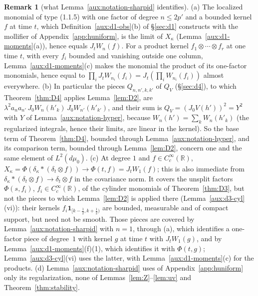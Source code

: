 \documentclass[11pt,a4paper]{article}
\theoremstyle{plain}
\theoremstyle{definition}
\theoremstyle{plain}
\theoremstyle{definition}
\newtheorem{auxrem}[auxlemma]{Remark}
\newcommand{\R}{\mathbb{R}}
\newcommand{\dmu}{d\mu_0}
\begin{document}
\begin{auxrem}[what Lemma~\ref{aux:notation-sharpid} identifies]\label{aux:notation-sharpidrem}
(a) The localized monomial of type (1.1.5) with one factor of degree $n\le2p'$ and a bounded
kernel $f$ at time $t$, which Definition~\ref{aux:d1-obs}(b) of \S\ref{sec:d1} constructs with the
mollifier of Appendix~\ref{app:huniform}, is the limit of $X_\kappa$ (Lemma~\ref{aux:d1-moments}(a)), hence equals
$J_tW_n(f)$.  For a product kernel $f_1\otimes\cdots\otimes f_r$ at one time $t$, with every $f_i$
bounded and vanishing outside one column, Lemma~\ref{aux:d1-moments}(c) makes the monomial the
product of its one-factor monomials, hence equal to
$\prod_iJ_tW_{n_i}(f_i)=J_t(\prod_iW_{n_i}(f_i))$ almost everywhere.
(b) In particular the pieces $Q_{n,n',k,k'}$ of $Q_V$ (\S\ref{sec:d4}), to which
Theorem~\ref{thm:D4} applies Lemma~\ref{lem:D2}, are
$\lambda^2a_na_{n'}\,J_0W_n(h'_k)\,J_0W_{n'}(h'_{k'})$, and their sum is $Q_V=(J_0V(h'))^2=Y^2$ with
$Y$ of Lemma~\ref{aux:notation-hyper}, because $W_n(h')=\sum_kW_n(h'_k)$ (the regularized integrals,
hence their limits, are linear in the kernel).  So the base term of Theorem~\ref{thm:D4}, bounded
through Lemma~\ref{aux:notation-hyper}, and its comparison term, bounded through
Lemma~\ref{lem:D2}, concern one and the same element of $L^2(\dmu)$.
(c) At degree $1$ and $f\in C_c^\infty(\R)$, $X_\kappa=\Phi(\delta_\kappa*(\delta_t\otimes f))\to
\Phi(t,f)=J_tW_1(f)$; this is also immediate from $\delta_\kappa*(\delta_t\otimes f)\to
\delta_t\otimes f$ in the covariance norm.  It covers the unsplit factors $\Phi(s,f_i)$,
$f_i\in C_c^\infty(\R)$, of the cylinder monomials of Theorem~\ref{thm:D3}, but not the pieces to
which Lemma~\ref{lem:D2} is applied there (Lemma~\ref{aux:d3-cyl}(vi)): their kernels
$f_i\mathbf 1_{[k-\frac12,k+\frac12)}$ are bounded, measurable and of compact support, but need
not be smooth.  Those pieces are covered by Lemma~\ref{aux:notation-sharpid} with $n=1$, through
(a), which identifies a one-factor piece of degree~$1$ with kernel $g$ at time $t$ with
$J_tW_1(g)$, and by Lemma~\ref{aux:d1-moments}(f)(1), which identifies it with $\Phi(t,g)$;
Lemma~\ref{aux:d3-cyl}(vi) uses the latter, with Lemma~\ref{aux:d1-moments}(c) for the
products.
(d) Lemma~\ref{aux:notation-sharpid} uses of Appendix~\ref{app:huniform} only its regularization,
none of Lemmas~\ref{lem:Z}--\ref{lem:uv} and Theorem~\ref{thm:stability}.
\end{auxrem}
\end{document}
